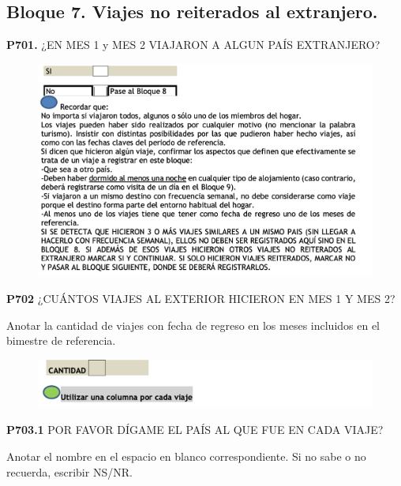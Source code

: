 \documentclass[
  openany]{book}
\begin{document}
\hypertarget{bloque-7.-viajes-no-reiterados-al-extranjero.}{%
\subsection{Bloque 7. Viajes no reiterados al extranjero.}\label{bloque-7.-viajes-no-reiterados-al-extranjero.}}

\textbf{P701.} ¿EN MES 1 y MES 2 VIAJARON A ALGUN PAÍS EXTRANJERO?

\begin{figure}

{\centering \includegraphics[width=1\linewidth]{imagenes/figura6-235} 

}

\end{figure}

\textbf{P702} ¿CUÁNTOS VIAJES AL EXTERIOR HICIERON EN MES 1 Y MES 2?

Anotar la cantidad de viajes con fecha de regreso en los meses incluidos en el bimestre de referencia.

\begin{figure}

{\centering \includegraphics[width=1\linewidth]{imagenes/figura6-236} 

}

\end{figure}

\textbf{P703.1} POR FAVOR DÍGAME EL PAÍS AL QUE FUE EN CADA VIAJE?

Anotar el nombre en el espacio en blanco correspondiente. Si no sabe o no recuerda, escribir NS/NR.
\end{document}
